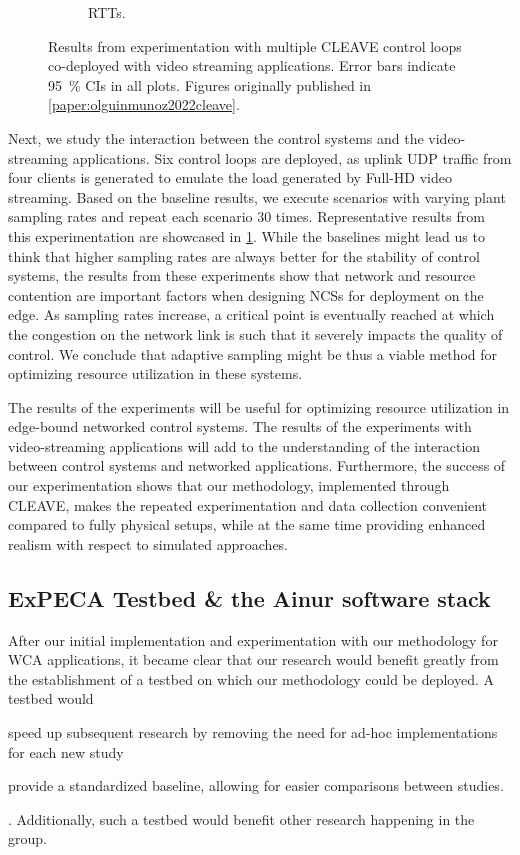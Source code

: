 \begin{figure}[t]
\begin{subfigure}[t]{.45\textwidth}
        \caption{\glspl{RTT}.}%
    \end{subfigure}%
    \caption{
        Results from experimentation with multiple \gls{CLEAVE} control loops co-deployed with video streaming applications.
        Error bars indicate \SI{95}{\percent} \glspl{CI} in all plots.
        Figures originally published in \cref{paper:olguinmunoz2022cleave}.
    }\label{fig:cleaveresults}
\end{figure}

Next, we study the interaction between the control systems and the video-streaming applications.
Six control loops are deployed, as uplink \gls{UDP} traffic from four clients is generated to emulate the load generated by Full-HD video streaming.
Based on the baseline results, we execute scenarios with varying plant sampling rates and repeat each scenario \num{30} times.
Representative results from this experimentation are showcased in \cref{fig:cleaveresults}.
While the baselines might lead us to think that higher sampling rates are always better for the stability of control systems, the results from these experiments show that network and resource contention are important factors when designing \glspl{NCS} for deployment on the edge.
As sampling rates increase, a critical point is eventually reached at which the congestion on the network link is such that it severely impacts the quality of control.
We conclude that adaptive sampling might be thus a viable method for optimizing resource utilization in these systems.

The results of the experiments will be useful for optimizing resource utilization in edge-bound networked control systems.
The results of the experiments with video-streaming applications will add to the understanding of the interaction between control systems and networked applications.
Furthermore, the success of our experimentation shows that our methodology, implemented through \gls{CLEAVE}, makes the repeated experimentation and data collection convenient compared to fully physical setups, while at the same time providing enhanced realism with respect to simulated approaches.

\subsection{ExPECA Testbed \& the Ainur software stack}

After our initial implementation and experimentation with our methodology for \gls{WCA} applications, it became clear that our research would benefit greatly from the establishment of a testbed on which our methodology could be deployed.
A testbed would
\begin{inlineenum}
    \item speed up subsequent research by removing the need for ad-hoc implementations for each new study
    \item provide a standardized baseline, allowing for easier comparisons between studies.
\end{inlineenum}.
Additionally, such a testbed would benefit other research happening in the group.

